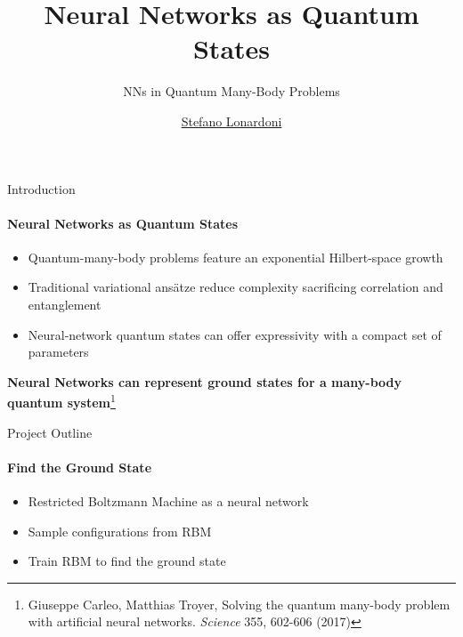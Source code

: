 \documentclass{beamer}
\title{Neural Networks as Quantum States}
\subtitle{NNs in Quantum Many-Body Problems}
\author{\href{mailto:stefano.lonardoni1@studenti.unimi.it}{Stefano Lonardoni}}
\begin{document}
\maketitle

\begin{frame}{Introduction}
\framesubtitle{Neural Networks as Quantum States}
\begin{itemize}
	\item Quantum-many-body problems feature an exponential Hilbert-space growth
	\item Traditional variational ansätze reduce complexity sacrificing correlation and entanglement
	\item Neural-network quantum states can offer expressivity with a compact set of parameters
\end{itemize}

\textbf{Neural Networks can represent ground states for a many-body quantum system}\footnote{Giuseppe Carleo, Matthias Troyer, Solving the quantum many-body problem with artificial neural networks. \textit{Science} 355, 602-606 (2017)}

\end{frame}

\begin{chapter}{}{Project Outline}
\framesubtitle{Find the Ground State}
\begin{itemize}
	\item Restricted Boltzmann Machine as a neural network
	\item Sample configurations from RBM
	\item Train RBM to find the ground state
\end{itemize}
\end{chapter}
\end{document}
